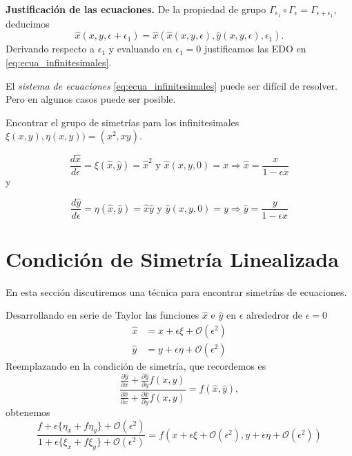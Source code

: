\textbf{Justificación de las ecuaciones.}
De la propiedad de grupo $ \Gamma_{\epsilon_1} \circ  \Gamma_{\epsilon}=
\Gamma_{\epsilon+\epsilon_1}$, deducimos 
\[\hat{x}(x,y,\epsilon+\epsilon_1)=\hat{x}(\hat{x}(x,y,\epsilon),
\hat{y}(x,y,\epsilon),\epsilon_1).\]
Derivando respecto a $\epsilon_1$ y evaluando en $\epsilon_1=0$ justificamos las EDO en 
\eqref{eq:ecua_infinitesimales}.




















El \emph{sistema de ecuaciones} \eqref{eq:ecua_infinitesimales}    puede ser difícil de resolver. Pero en algunos casos puede ser posible.

 \begin{ejemplo}{} Encontrar el grupo de simetrías para los infinitesimales $\xi(x,y),\eta(x,y))=(x^2,xy)$.
   \end{ejemplo}



\[ \frac{d\hat{x}}{d\epsilon}=\xi(\hat{x},\hat{y})=\hat{x}^2\text{ y }\hat{x}(x,y,0)=x
\Rightarrow \hat{x}=\frac{x}{1-\epsilon x}\]
y

\[ \frac{d\hat{y}}{d\epsilon}=\eta(\hat{x},\hat{y})=\hat{x}\hat{y}\text{ y }\hat{y}(x,y,0)=y
\Rightarrow \hat{y}=\frac{y}{1-\epsilon x}\]

\section{Condición de Simetría Linealizada}
En esta sección discutiremos una técnica para encontrar simetrías de ecuaciones. 


Desarrollando en serie de Taylor las funciones $\hat{x}$ e $\hat{y}$ en $\epsilon$ alrededror de $\epsilon=0$
\[
 \begin{split}
  \hat{x}&=x+\epsilon\xi+\mathcal{O}(\epsilon^2)\\
  \hat{y}&=y+\epsilon\eta+\mathcal{O}(\epsilon^2)
  \end{split}
\]
Reemplazando en la condición de simetría, que recordemos es
\[\frac{\frac{\partial\hat{y}}{\partial x}+\frac{\partial\hat{y}}{\partial y}
 f(x,y)}{\frac{\partial\hat{x}}{\partial x}+\frac{\partial\hat{x}}{\partial y}f(x,y)}
 =f(\hat{x},\hat{y}),
\] 
obtenemos
\[\frac{f+\epsilon\{\eta_x+f\eta_y\}+\mathcal{O}(\epsilon^2)}
{1+\epsilon\{\xi_x+f\xi_y\}+\mathcal{O}(\epsilon^2)}
=f(x+\epsilon\xi+\mathcal{O}(\epsilon^2),y+\epsilon\eta+\mathcal{O}(\epsilon^2))
\]



